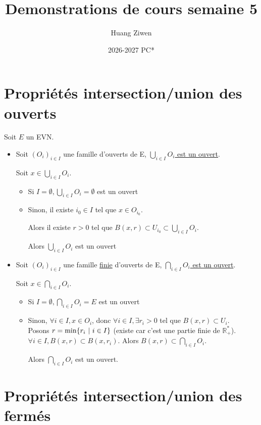 \documentclass[]{article}
\title{Demonstrations de cours semaine 5}
\author{Huang Ziwen}
\date{2026-2027 PC*}
\begin{document}
\section{Propriétés intersection/union des ouverts}

Soit $E$ un EVN. 

\begin{itemize}
    \item Soit $(O_i)_{i \in I}$ une famille d'ouverts de E, \underline{$\bigcup_{i\in I} O_i$ est un ouvert}.
    
    Soit $x \in \bigcup_{i\in I} O_i$. 
    \begin{itemize}
        \item Si $I = \emptyset, \bigcup_{i\in I} O_i = \emptyset$ est un ouvert
        \item Sinon, il existe $i_0 \in I$ tel que $x \in O_{i_0}$. 
        
        Alors il existe $r>0$ tel que $B(x,r) \subset U_{i_0} \subset \bigcup_{i\in I} O_i$.

        Alors $\bigcup_{i\in I} O_i$ est un ouvert 
    \end{itemize}

    \item Soit $(O_i)_{i \in I}$ une famille \underline{finie} d'ouverts de E, \underline{$\bigcap_{i\in I} O_i$ est un ouvert}.
    
    Soit $x \in \bigcap_{i\in I} O_i$.
    \begin{itemize}
        \item Si $I = \emptyset, \bigcap_{i\in I} O_i = E$ est un ouvert
        \item Sinon, $\forall i \in I, x \in O_i$, donc $ \forall i \in I, \exists r_i > 0$ tel que $B(x, r) \subset U_i$. \\
        
        Posons $r = \min\{r_i \text{ } | \text{ } i \in I\}$ (existe car c'est une partie finie de $\mathbb{R}_+^*$).\\

        $\forall i \in I, B(x, r) \subset B(x, r_i)$. Alors $B(x, r) \subset \bigcap_{i\in I} O_i$. 

        Alors $\bigcap_{i\in I} O_i$ est un ouvert.
    \end{itemize}
\end{itemize}

\section{Propriétés intersection/union des fermés}
\end{document}

